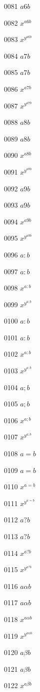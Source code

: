 \documentclass{article}
\begin{document}
0081 $\displaystyle a6b$\par
0082 $x^{a6b}$\par
0083 $x^{y^{a6b}}$\par
0084 $a7b$\par
0085 $\displaystyle a7b$\par
0086 $x^{a7b}$\par
0087 $x^{y^{a7b}}$\par
0088 $a8b$\par
0089 $\displaystyle a8b$\par
0090 $x^{a8b}$\par
0091 $x^{y^{a8b}}$\par
0092 $a9b$\par
0093 $\displaystyle a9b$\par
0094 $x^{a9b}$\par
0095 $x^{y^{a9b}}$\par
0096 $a:b$\par
0097 $\displaystyle a:b$\par
0098 $x^{a:b}$\par
0099 $x^{y^{a:b}}$\par
0100 $a\colon b$\par
0101 $\displaystyle a\colon b$\par
0102 $x^{a\colon b}$\par
0103 $x^{y^{a\colon b}}$\par
0104 $a;b$\par
0105 $\displaystyle a;b$\par
0106 $x^{a;b}$\par
0107 $x^{y^{a;b}}$\par
0108 $a=b$\par
0109 $\displaystyle a=b$\par
0110 $x^{a=b}$\par
0111 $x^{y^{a=b}}$\par
0112 $a?b$\par
0113 $\displaystyle a?b$\par
0114 $x^{a?b}$\par
0115 $x^{y^{a?b}}$\par
0116 $a\alpha b$\par
0117 $\displaystyle a\alpha b$\par
0118 $x^{a\alpha b}$\par
0119 $x^{y^{a\alpha b}}$\par
0120 $a\beta b$\par
0121 $\displaystyle a\beta b$\par
0122 $x^{a\beta b}$\par
\end{document}
